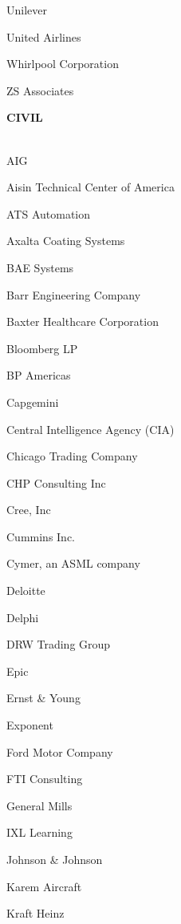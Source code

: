 \documentclass[twoside]{article}
\begin{document}
\begin{center}
\begin{multicols}{5}
\begin{FlushLeft}
\begin{compactitem}
\item Unilever
\item United Airlines
\item Whirlpool Corporation
\item ZS Associates
\end{compactitem}
        \end{FlushLeft}
        \vspace{1em}
        {\fontsize{14}{16}\selectfont \bf CIVIL}\\
        \vspace{-1em}
        ~\hrulefill~
        \vspace{-.9em}
        \begin{FlushLeft}
        \begin{compactitem}
        \item AIG
\item Aisin Technical Center of America
\item ATS Automation
\item Axalta Coating Systems
\item BAE Systems
\item Barr Engineering Company
\item Baxter Healthcare Corporation
\item Bloomberg LP
\item BP Americas
\item Capgemini
\item Central Intelligence Agency (CIA)
\item Chicago Trading Company
\item CHP Consulting Inc
\item Cree, Inc
\item Cummins Inc.
\item Cymer, an ASML company
\item Deloitte
\item Delphi
\item DRW Trading Group
\item Epic
\item Ernst \& Young
\item Exponent
\item Ford Motor Company
\item FTI Consulting
\item General Mills
\item IXL Learning
\item Johnson \& Johnson
\item Karem Aircraft
\item Kraft Heinz

\end{compactitem}
\end{FlushLeft}
\end{multicols}
\end{center}
\end{document}
